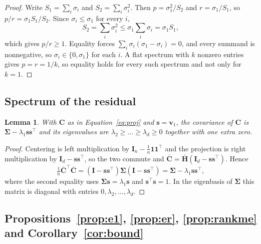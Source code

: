 \documentclass{article}
\theoremstyle{spaced}
\newtheorem{lemma}{Lemma}
\theoremstyle{definition}
\newcommand{\bH}{\mathbf{H}}
\newcommand{\bC}{\mathbf{C}}
\newcommand{\bs}{\mathbf{s}}
\newcommand{\bv}{\mathbf{v}}
\newcommand{\bI}{\mathbf{I}}
\newcommand{\bSig}{\boldsymbol{\Sigma}}
\begin{document}
\begin{proof}
Write $S_1 = \sum_i \sigma_i$ and $S_2 = \sum_i \sigma_i^2$. Then $p = \sigma_1^2/S_2$ and $r = \sigma_1/S_1$, so $p/r = \sigma_1 S_1 / S_2$. Since $\sigma_i \le \sigma_1$ for every $i$,
\[
S_2 = \sum_i \sigma_i^2 \le \sigma_1 \sum_i \sigma_i = \sigma_1 S_1 ,
\]
which gives $p/r \ge 1$. Equality forces $\sum_i \sigma_i(\sigma_1 - \sigma_i) = 0$, and every summand is nonnegative, so $\sigma_i \in \{0, \sigma_1\}$ for each $i$. A flat spectrum with $k$ nonzero entries gives $p = r = 1/k$, so equality holds for every such spectrum and not only for $k=1$.
\end{proof}

\subsection{Spectrum of the residual}

\begin{lemma}
\label{lem:resid}
With $\bC$ as in Equation~\ref{eq:proj} and $\bs = \bv_1$, the covariance of $\bC$ is $\bSig - \lambda_1\bs\bs^\top$ and its eigenvalues are $\lambda_2 \ge \dots \ge \lambda_d \ge 0$ together with one extra zero.
\end{lemma}

\begin{proof}
Centering is left multiplication by $\bI_n - \tfrac1n\mathbf{1}\mathbf{1}^\top$ and the projection is right multiplication by $\bI_d - \bs\bs^\top$, so the two commute and $\bar{\bC} = \bar{\bH}(\bI_d - \bs\bs^\top)$. Hence
\[
\tfrac1n\bar{\bC}^\top\bar{\bC} = (\bI-\bs\bs^\top)\bSig(\bI-\bs\bs^\top) = \bSig - \lambda_1\bs\bs^\top,
\]
where the second equality uses $\bSig\bs = \lambda_1\bs$ and $\bs^\top\bs = 1$. In the eigenbasis of $\bSig$ this matrix is diagonal with entries $0, \lambda_2, \dots, \lambda_d$.
\end{proof}

\subsection{Propositions~\ref{prop:e1}, \ref{prop:er}, \ref{prop:rankme} and Corollary~\ref{cor:bound}}
\end{document}

